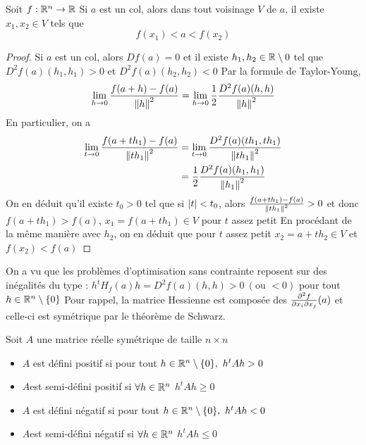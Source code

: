 \begin{proposition}
    Soit $f : \mathbb{R}^n \to \mathbb{R} $
    Si $a$ est un col, alors dans tout voisinage $V$ de $a$, il existe $x_1,x_2\in V$ tels que $$f(x_1)<a<f(x_2)$$
\end{proposition}
\begin{proof}
    Si $a$ est un col, alors $Df(a) = 0$ 
    et il existe $h_1, h_2 \in \mathbb{R}\setminus{0}$ tel que $D^2f(a)(h_1,h_1)>0$ et $D^2f(a)(h_2,h_2)<0$
    Par la formule de Taylor-Young,
    \begin{align*}
        \lim_{h\to 0}\frac{f(a+h)-f(a)}{\left\| h \right\| ^2} = \lim_{h\to 0}\frac 12\frac{D^2f(a)(h,h)}{\left\| h \right\| ^2}
    \end{align*}
    En particulier, on a 
    \begin{align*}
        \lim_{t \to 0} \frac{f(a+th_1) - f(a)}{\left\| th_1 \right\|^2}
        &= \lim_{t \to 0}\frac{D^2f(a)(th_1,th_1)}{\left\| th_1 \right\|^2}\\
        &= \frac 12\frac{D^2f(a)(h_1,h_1)}{\left\| h_1 \right\|^2}
    \end{align*}
    On en déduit qu'il existe $t_0 > 0$ tel que si $\left| t \right| < t_0$,
    alors $\frac{f(a+th_1)-f(a)}{\left\| th_1 \right\|^2} > 0$ et donc $f(a+th_1) > f(a)$, $x_1 = f(a+th_1) \in V$ pour $t$ assez petit
    En procédant de la même manière avec $h_2$, on en déduit que pour $t$ assez petit $x_2 = a + th_2\in V$ et $f(x_2)<f(a)$
\end{proof}
On a vu que les problèmes d’optimisation sans contrainte reposent sur des inégalités du type : $ h^tH_f(a) h = D^2f(a)(h,h)>0\ (\text {ou } <0)$ pour tout $h\in\mathbb{R}^n\setminus\{0\}$
Pour rappel, la matrice Hessienne est composée des $\frac{\partial ^2f}{\partial x_i\partial x_j}(a)$ et celle-ci est symétrique par le théorème de Schwarz.
\begin{definition}
Soit $A$ une matrice réelle symétrique de taille $n\times n$
\begin{itemize}
    \item $A$ est défini positif si pour tout $h\in\mathbb{R}^n\setminus\{0\},\ h^t A h >0$
    \item $A$est semi-défini positif si $\forall h \in \mathbb{R}^n$ 
    $ h^tAh \ge 0$
    
    \item $A$ est défini négatif si pour tout $h\in\mathbb{R}^n\setminus\{0\},\ h^t A h <0$
     \item $A$est semi-défini négatif si $\forall h \in \mathbb{R}^n$ 
    $ h^tAh \le 0$
\end{itemize}
\end{definition}
